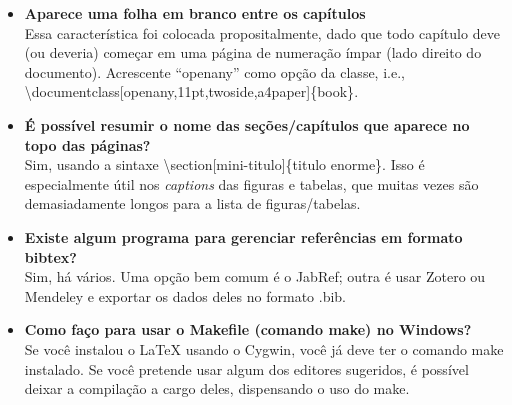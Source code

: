 \begin{itemize}
\item \textbf{Aparece uma folha em branco entre os capítulos}\\
Essa característica foi colocada propositalmente, dado que todo capítulo deve (ou deveria) começar em uma página de numeração ímpar (lado direito do documento). Acrescente ``openany'' como opção da classe, i.e., \textsf{\textbackslash{}documentclass[openany,11pt,twoside,a4paper]\{book\}}.

\item \textbf{É possível resumir o nome das seções/capítulos que aparece no topo das páginas?}\\
Sim, usando a sintaxe \textsf{\textbackslash{}section[mini-titulo]\{titulo enorme\}}. Isso é especialmente útil nos \textit{captions} das figuras e tabelas, que muitas vezes são demasiadamente longos para a lista de figuras/tabelas.

\item \textbf{Existe algum programa para gerenciar referências em formato bibtex?}\\
Sim, há vários. Uma opção bem comum é o JabRef; outra é usar Zotero ou Mendeley e exportar os dados deles no formato .bib.

\item \textbf{Como faço para usar o Makefile (comando make) no Windows?}\\
Se você instalou o \LaTeX{} usando o Cygwin, você já deve ter o comando make instalado. Se você pretende usar algum dos editores sugeridos, é possível deixar a compilação a cargo deles, dispensando o uso do make.
\end{itemize}
